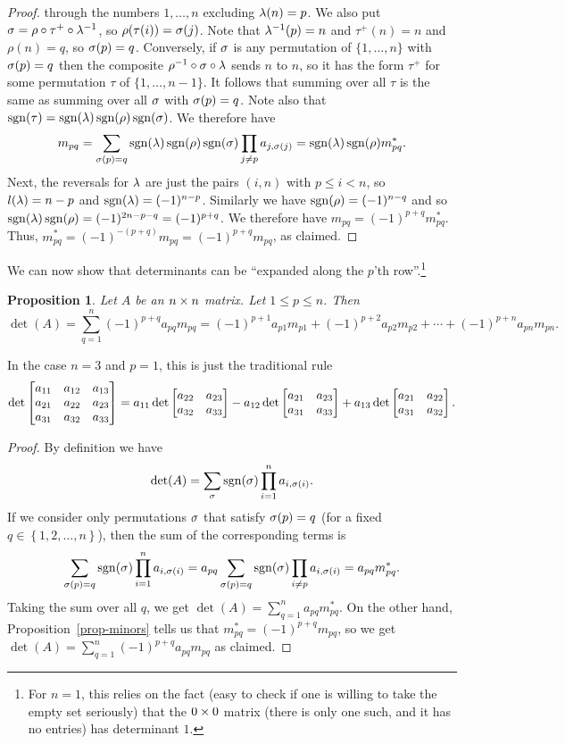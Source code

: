 \documentclass[reqno]{amsart}
\newtheorem{proposition}[theorem]{Proposition}
\theoremstyle{definition}
\begin{document}
\begin{proof}
 through the numbers $1,\dotsc,n$ excluding $\lambda(n)=p$.  We also put
 $\sigma=\rho\circ\tau^+\circ\lambda^{-1}$, so $\rho(\tau(i))=\sigma(j)$.  Note
 that $\lambda^{-1}(p)=n$ and $\tau^+(n)=n$ and $\rho(n)=q$, so
 $\sigma(p)=q$.  Conversely, if $\sigma$ is any permutation of
 $\{1,\dotsc,n\}$ with $\sigma(p)=q$ then the composite
 $\rho^{-1}\circ\sigma\circ\lambda$ sends $n$ to $n$, so it has the form
 $\tau^+$ for some permutation $\tau$ of $\{1,\dotsc,n-1\}$.  It follows
 that summing over all $\tau$ is the same as summing over all $\sigma$
 with $\sigma(p)=q$.  Note also that
 $\operatorname{sgn}(\tau)=\operatorname{sgn}(\lambda)\operatorname{sgn}(\rho)\operatorname{sgn}(\sigma)$.  We therefore have
 \[ m_{pq}
     = \sum_{\sigma(p)=q} \operatorname{sgn}(\lambda)\operatorname{sgn}(\rho)\operatorname{sgn}(\sigma)
        \prod_{j\neq p} a_{j,\sigma(j)}
     = \operatorname{sgn}(\lambda)\operatorname{sgn}(\rho) m^*_{pq}.
 \]
 Next, the reversals for $\lambda$ are just the pairs $(i,n)$ with $p\leq
 i<n$, so $l(\lambda)=n-p$ and $\operatorname{sgn}(\lambda)=(-1)^{n-p}$.  Similarly we have
 $\operatorname{sgn}(\rho)=(-1)^{n-q}$ and so
 $\operatorname{sgn}(\lambda)\operatorname{sgn}(\rho)=(-1)^{2n-p-q}=(-1)^{p+q}$.  We therefore have
 $m_{pq}=(-1)^{p+q}m^*_{pq}$.
 Thus,
 $m^*_{pq}=(-1)^{-(p+q)}m_{pq}=(-1)^{p+q}m_{pq}$,
 as claimed.
\end{proof}

We can now show that determinants can be ``expanded along the $p$'th
row''.\footnote{For $n = 1$,
this relies on the fact (easy to check if one is willing to take
the empty set seriously) that the $0 \times 0$ matrix
(there is only one such, and it has no entries) has determinant
$1$.}

\begin{proposition}\label{prop-det-expand}
 Let $A$ be an $n\times n$ matrix.  Let $1 \leq p \leq n$.
 Then
 \[ \det(A) = \sum_{q=1}^n (-1)^{p+q}a_{pq}m_{pq} =
     (-1)^{p+1} a_{p1} m_{p1} + (-1)^{p+2} a_{p2}m_{p2} + \dotsb + (-1)^{p+n} a_{pn}m_{pn}.
 \]
\end{proposition}

In the case $n=3$ and $p=1$, this is just the traditional rule
\[ \det\left[\begin{matrix} a_{11} & a_{12} & a_{13} \\
            a_{21} & a_{22} & a_{23} \\
            a_{31} & a_{32} & a_{33} \end{matrix}\right] =
     a_{11} \det\left[\begin{matrix} a_{22} & a_{23} \\ a_{32} & a_{33} \end{matrix}\right]
    -a_{12} \det\left[\begin{matrix} a_{21} & a_{23} \\ a_{31} & a_{33} \end{matrix}\right]
    +a_{13} \det\left[\begin{matrix} a_{21} & a_{22} \\ a_{31} & a_{32} \end{matrix}\right].
\]

\begin{proof}
 By definition we have
 \[ \det(A) = \sum_\sigma \operatorname{sgn}(\sigma)\prod_{i=1}^n a_{i,\sigma(i)}. \]
 If we consider only permutations $\sigma$ that satisfy $\sigma(p)=q$
 (for a fixed $q \in \left\{1,2,\ldots,n\right\}$), then
 the sum of the corresponding terms is
 \[ \sum_{\sigma(p)=q} \operatorname{sgn}(\sigma)\prod_{i=1}^n a_{i,\sigma(i)}
     = a_{pq} \sum_{\sigma(p)=q} \operatorname{sgn}(\sigma)\prod_{i\neq p} a_{i,\sigma(i)}
     = a_{pq} m^*_{pq}.
 \]
 Taking the sum over all $q$, we get
 $\det(A)=\sum_{q=1}^n a_{pq}m^*_{pq}$.  On the other hand,
 Proposition~\ref{prop-minors} tells us that
 $m^*_{pq}=(-1)^{p+q}m_{pq}$, so we get
 $\det(A)=\sum_{q=1}^n (-1)^{p+q}a_{pq}m_{pq}$ as claimed.
\end{proof}
\end{document}
